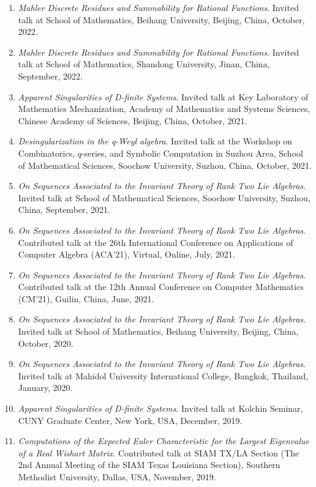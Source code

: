 \documentclass[a4paper,12pt]{article}
\begin{document}
\begin{enumerate}
\item {\em Mahler Discrete Residues and Summability for Rational Functions}. 
Invited talk at School of Mathematics, Beihang University, Beijing, China, October, 2022. 
\item {\em Mahler Discrete Residues and Summability for Rational Functions}. 
Invited talk at School of Mathematics, Shandong University, Jinan, China, September, 2022. 
\item {\em Apparent Singularities of D-finite Systems}.
Invited talk at Key Laboratory of Mathematics Mechanization, Academy of Mathematics and Systems Sciences,
 Chinese Academy of Sciences, Beijing, China, October, 2021. 
 \item {\em Desingularization in the q-Weyl algebra}. 
 Invited talk at the Workshop on Combinatorics, $q$-series, and Symbolic Computation in Suzhou Area, School of Mathematical Sciences, Soochow University, Suzhou, China, October, 2021.
\item {\em On Sequences Associated to the Invariant Theory of Rank Two Lie Algebras}.
Invited talk at School of Mathematical Sciences, Soochow University, Suzhou, 
China, September, 2021.
\item {\em On Sequences Associated to the Invariant Theory of Rank Two Lie Algebras}.
Contributed talk at the 26th International Conference on Applications of Computer Algebra (ACA'21), Virtual, Online, July, 2021.
\item {\em On Sequences Associated to the Invariant Theory of Rank Two Lie Algebras}.
Contributed talk at the 12th Annual Conference on Computer Mathematics (CM'21), Guilin, China, June, 2021.
\item {\em On Sequences Associated to the Invariant Theory of Rank Two Lie Algebras}.
Invited talk at School of Mathematics, Beihang University, Beijing, China, October, 2020.
\item {\em On Sequences Associated to the Invariant Theory of Rank Two Lie Algebras}.
Invited talk at Mahidol University International College, Bangkok, Thailand, January, 2020.
\item {\em Apparent Singularities of D-finite Systems}.
Invited talk at Kolchin Seminar, CUNY Graduate Center, New York, USA, December, 2019. 
\item {\em Computations of the Expected Euler Characteristic for the Largest Eigenvalue of a Real Wishart Matrix}.
Contributed talk at SIAM TX/LA Section (The 2nd Annual Meeting of the SIAM Texas Louisiana Section), Southern Methodist University, Dallas, USA, November, 2019.

\end{enumerate}
\end{document}
